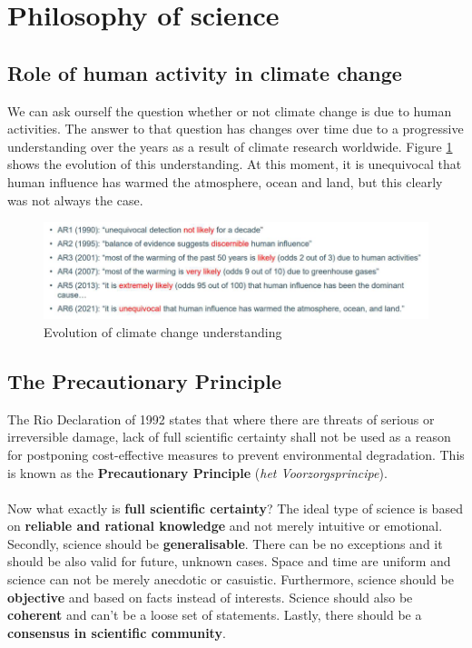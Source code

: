 \documentclass[../summary.tex]{subfiles}
\begin{document}
	
	\section{Philosophy of science}
	
	\subsection{Role of human activity in climate change}
	
	We can ask ourself the question whether or not climate change is due to human activities. The answer to that question has changes over time due to a progressive understanding over the years as a result of climate research worldwide. Figure \ref{fig:progressive-understanding-climate-change} shows the evolution of this understanding. At this moment, it is unequivocal that human influence has warmed the atmosphere, ocean and land, but this clearly was not always the case.
	
	\begin{figure} [htbp]
		\centering
		\includegraphics[width=1\linewidth]{images/progressive-understanding-climate-change.png}
		\caption{Evolution of climate change understanding}
		\label{fig:progressive-understanding-climate-change}
	\end{figure}
	
	\subsection{The Precautionary Principle}
	
	The Rio Declaration of 1992 states that where there are threats of serious or irreversible damage, lack of full scientific certainty shall not be used as a reason for postponing cost-effective measures to prevent environmental degradation. This is known as the \textbf{Precautionary Principle} (\textit{het Voorzorgsprincipe}).
	\\\\
	Now what exactly is \textbf{full scientific certainty}? The ideal type of science is based on \textbf{reliable and rational knowledge} and not merely intuitive or emotional. Secondly, science should be \textbf{generalisable}. There can be no exceptions and it should be also valid for future, unknown cases. Space and time are uniform and science can not be merely anecdotic or casuistic. Furthermore, science should be \textbf{objective} and based on facts instead of interests. Science should also be \textbf{coherent} and can't be a loose set of statements. Lastly, there should be a \textbf{consensus in scientific community}. 
	
\end{document}
